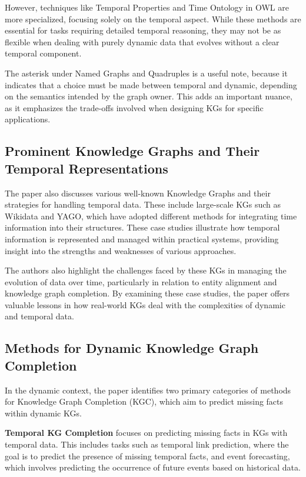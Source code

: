 However, techniques like Temporal Properties and Time Ontology in OWL are more specialized, focusing solely on the temporal aspect. While these methods are essential for tasks requiring detailed temporal reasoning, they may not be as flexible when dealing with purely dynamic data that evolves without a clear temporal component.

The asterisk under Named Graphs and Quadruples is a useful note, because it indicates that a choice must be made between temporal and dynamic, depending on the semantics intended by the graph owner. This adds an important nuance, as it emphasizes the trade-offs involved when designing KGs for specific applications.

\subsection{Prominent Knowledge Graphs and Their Temporal Representations}

The paper also discusses various well-known Knowledge Graphs and their strategies for handling temporal data. These include large-scale KGs such as Wikidata and YAGO, which have adopted different methods for integrating time information into their structures. These case studies illustrate how temporal information is represented and managed within practical systems, providing insight into the strengths and weaknesses of various approaches.

The authors also highlight the challenges faced by these KGs in managing the evolution of data over time, particularly in relation to entity alignment and knowledge graph completion. By examining these case studies, the paper offers valuable lessons in how real-world KGs deal with the complexities of dynamic and temporal data.

\subsection{Methods for Dynamic Knowledge Graph Completion}

In the dynamic context, the paper identifies two primary categories of methods for Knowledge Graph Completion (KGC), which aim to predict missing facts within dynamic KGs.

\textbf{Temporal KG Completion} focuses on predicting missing facts in KGs with temporal data. This includes tasks such as temporal link prediction, where the goal is to predict the presence of missing temporal facts, and event forecasting, which involves predicting the occurrence of future events based on historical data.

